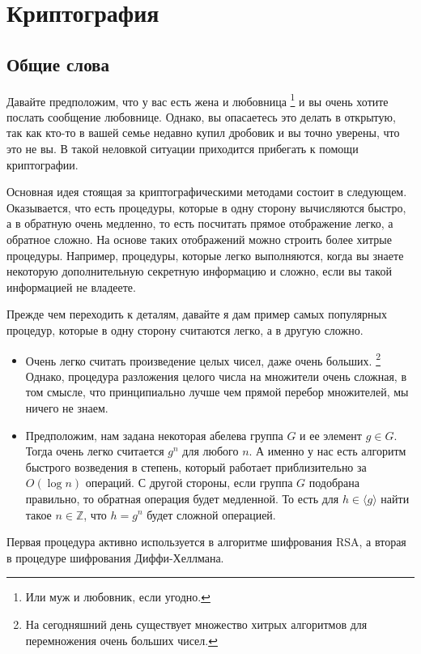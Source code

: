 \section{Криптография}

\subsection{Общие слова}

Давайте предположим, что у вас есть жена и любовница%
\footnote{Или муж и любовник, если угодно.}
и вы очень хотите послать сообщение любовнице.
Однако, вы опасаетесь это делать в открытую, так как кто-то в вашей семье недавно купил дробовик и вы точно уверены, что это не вы.
В такой неловкой ситуации приходится прибегать к помощи криптографии.

Основная идея стоящая за криптографическими методами состоит в следующем.
Оказывается, что есть процедуры, которые в одну сторону вычисляются быстро, а в обратную очень медленно, то есть посчитать прямое отображение легко, а обратное сложно.
На основе таких отображений можно строить более хитрые процедуры.
Например, процедуры, которые легко выполняются, когда вы знаете некоторую дополнительную секретную информацию и сложно, если вы такой информацией не владеете.

Прежде чем переходить к деталям, давайте я дам пример самых популярных процедур, которые в одну сторону считаются легко, а в другую сложно.
\begin{itemize}
\item Очень легко считать произведение целых чисел, даже очень больших.%
\footnote{На сегодняшний день существует множество хитрых алгоритмов для перемножения очень больших чисел.}
Однако, процедура разложения целого числа на множители очень сложная, в том смысле, что принципиально лучше чем прямой перебор множителей, мы ничего не знаем.

\item  Предположим, нам задана некоторая абелева группа $G$ и ее элемент $g\in G$.
Тогда очень легко считается $g^n$ для любого $n$.
А именно у нас есть алгоритм быстрого возведения в степень, который работает приблизительно за $O(\log n)$ операций.
С другой стороны, если группа $G$ подобрана правильно, то обратная операция будет медленной.
То есть для $h\in \langle g \rangle$ найти такое $n\in \mathbb Z$, что $h = g^n$ будет сложной операцией.
\end{itemize}
Первая процедура активно используется в алгоритме шифрования RSA, а вторая в процедуре шифрования Диффи-Хеллмана.

